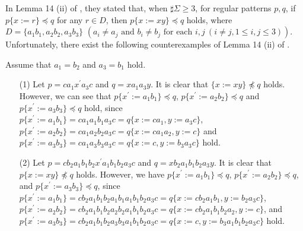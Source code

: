 In Lemma 14 (ii) of \cite{Sato1}, 
they stated that, when $\sharp \Sigma \geq 3$, for regular patterns $p,q$, if $p\{x:=r\}\preceq q$ for any $r\in D$, then $p\{x:=xy\} \preceq q$ holds, where 
$D = \{ a_{1}b_{1}, a_{2}b_{2}, a_{3}b_{3}\}$ $(a_{i} \ne a_{j} \mbox{ and } b_{i} \ne b_{j} \mbox{ for each } i,j~(i\ne j, 1\le i,j\le 3))$.
Unfortunately, there exist the following counterexamples of Lemma 14 (ii) of \cite{Sato1}.
\begin{ex}\label{CounterExample_Lemma14}
Assume that $a_1=b_2$ and $a_3=b_1$ hold.
  
\begin{itemize}
\item[(1)] 
Let $p=ca_1x^{\prime}a_3c$ and $q=xa_1a_3y$.
It is clear that $\{x:=xy\} \not\preceq q$ holds.
However, we can see that $p\{x^{\prime}:=a_1b_1\}\preceq q$, $p\{x^{\prime}:=a_2b_2\}\preceq q$ and $p\{x^{\prime}:=a_3b_3\}\preceq q$ hold, 
since
$p\{x^{\prime}:=a_1b_1\}=ca_1a_1b_1a_3c=q\{x:=ca_1,y:=a_3c\}$,
$p\{x^{\prime}:=a_2b_2\}=ca_1a_2b_2a_3c=q\{x:=ca_1a_2,y:=c\}$ and 
$p\{x^{\prime}:=a_3b_3\}=ca_1a_3b_3a_3c=q\{x:=c,y:=b_3a_3c\}$ hold.

\item[(2)] 
Let $p=cb_2a_1b_1b_2x^{\prime}a_1b_1b_2a_3c$ and $q=xb_2a_1b_1b_2a_3y$.
It is clear that $p\{x:=xy\} \not\preceq q$ holds.
However, we have $p\{x^{\prime}:=a_1b_1\}\preceq q$, $p\{x^{\prime}:=a_2b_2\} \preceq q$, and $p\{x^{\prime}:=a_3b_3\} \preceq q$, 
since  
$p\{x^{\prime}:=a_1b_1\}=cb_2a_1b_1b_2a_1b_1a_1b_1b_2a_3c=q\{x:=cb_2a_1b_1,y:=b_2a_3c\}$,
$p\{x^{\prime}:=a_2b_2\}=cb_2a_1b_1b_2a_2b_2a_1b_1b_2a_3c=q\{x:=cb_2a_1b_1b_2a_2,y:=c\}$,
and  $p\{x^{\prime}:=a_3b_3\}=cb_2a_1b_1b_2a_3b_3a_1b_1b_2a_3c=q\{x:=c,y:=b_3a_1b_1b_2a_3c\}$ hold.
\end{itemize}
\end{ex}

